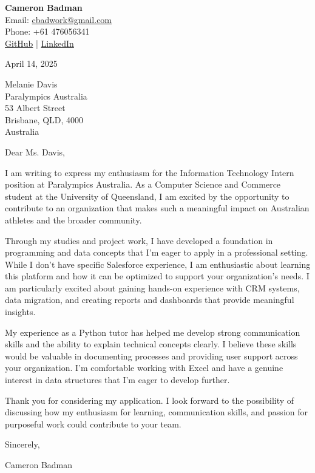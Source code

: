 \documentclass[11pt,a4paper]{letter}
\begin{document}
	
	\begin{flushright}
		\textbf{Cameron Badman}\\
		Email: \href{mailto:cbadwork@gmail.com}{cbadwork@gmail.com}\\
		Phone: +61 476056341\\
		\href{https://github.com/CameronBadman}{GitHub} | \href{https://www.linkedin.com/in/cameron-badman-5314ba1b8/}{LinkedIn}\\
	\end{flushright}
	
	\vspace{0.5cm}
	\noindent April 14, 2025
	
	\vspace{0.5cm}
	\noindent Melanie Davis\\
	Paralympics Australia\\
	53 Albert Street\\
	Brisbane, QLD, 4000\\
	Australia
	
	\vspace{0.5cm}
	\noindent Dear Ms. Davis,
	
	\vspace{0.3cm}
	I am writing to express my enthusiasm for the Information Technology Intern position at Paralympics Australia. As a Computer Science and Commerce student at the University of Queensland, I am excited by the opportunity to contribute to an organization that makes such a meaningful impact on Australian athletes and the broader community.
	
	Through my studies and project work, I have developed a foundation in programming and data concepts that I'm eager to apply in a professional setting. While I don't have specific Salesforce experience, I am enthusiastic about learning this platform and how it can be optimized to support your organization's needs. I am particularly excited about gaining hands-on experience with CRM systems, data migration, and creating reports and dashboards that provide meaningful insights.
	
	My experience as a Python tutor has helped me develop strong communication skills and the ability to explain technical concepts clearly. I believe these skills would be valuable in documenting processes and providing user support across your organization. I'm comfortable working with Excel and have a genuine interest in data structures that I'm eager to develop further.
	
	Thank you for considering my application. I look forward to the possibility of discussing how my enthusiasm for learning, communication skills, and passion for purposeful work could contribute to your team.
	
	\vspace{0.5cm}
	\noindent Sincerely,
	
	\vspace{1cm}
	\noindent Cameron Badman
	
\end{document}
